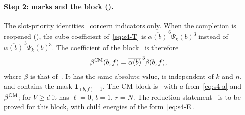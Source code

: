 \documentclass[11pt]{article}
\numberwithin{equation}{section}
\newcommand{\ind}{\mathbf1}
\begin{document}
\paragraph{Step 2: marks and the block (\cite[proof of Lemma~17.2]{OAI78}).} The slot-priority identities~\cite[eq.~(17.15),
eq.~(17.16)]{OAI78} concern indicators only. When the completion is reopened (\cite[proof of Lemma~17.2, \emph{The remaining terms and their marks}]{OAI78}), the
cube coefficient of~\eqref{eq:s4-T} is $\overline{\alpha(b)}^{\,6}\Psi_k(b)^3$ instead of
$\overline{\alpha(b)}^{\,3}\Psi_k(b)^3$. The coefficient of the block~\cite[eq.~(A)]{OAI78} is therefore
\begin{equation}\label{eq:s4-beta}
 \beta^{\rm CM}(b,f)=\overline{\alpha(b)}^{\,3}\beta(b,f),
\end{equation}
where $\beta$ is that of~\cite{OAI78}. It has the same absolute value, is independent of $k$ and $n$, and contains
the mask $\ind_{(b,f)=1}$. The CM block is~\cite[eq.~(A)]{OAI78} with $a$ from~\eqref{eq:s4-a} and
$\beta^{\rm CM}$; for $V\ge d$ it has $\ell=0$, $b=1$, $r=N$. The reduction
statement~\cite[eq.~(17.17)]{OAI78} is to be proved for this block, with child energies
of the form~\eqref{eq:s4-E}.
\end{document}
